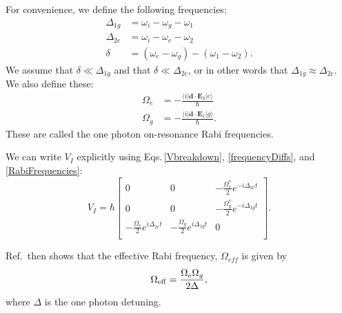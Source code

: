 For convenience, we define the following frequencies: 
\begin{align}
\label{frequencyDiffs}
\Delta_{1g}&=\omega_i-\omega_g-\omega_1\\
\Delta_{2e}&=\omega_i-\omega_e-\omega_2\\
\delta&=(\omega_e-\omega_g)-(\omega_1-\omega_2).
\end{align}
We assume that $\delta\ll\Delta_{1g}$ and that $\delta\ll\Delta_{2e}$, or in other words that $\Delta_{1g}\approx\Delta_{2e}$.
We also define these:
\begin{align}
\label{RabiFrequencies}
\Omega_e&=-\frac{\langle i | \mathbf{d}\cdot \mathbf{E}_2 | e\rangle }{\hbar}\\
\Omega_g&=-\frac{\langle i | \mathbf{d}\cdot \mathbf{E}_1 | g\rangle}{\hbar}.
\end{align}
These are called the one photon on-resonance Rabi frequencies.

We can write $V_I$ explicitly using Eqs.\,\eqref{Vbreakdown}, \eqref{frequencyDiffs}, and \eqref{RabiFrequencies}:
\begin{equation}
\label{VI_matrix_simplified}
V_I=
\hbar
\begin{bmatrix}
0 & 0 & -\frac{\Omega_e^*}{2}e^{-i\Delta_{2e}t} \\
0 & 0 & -\frac{\Omega_g^*}{2}e^{-i\Delta_{1g}t}\\
-\frac{\Omega_e}{2}e^{i\Delta_{2e}t} & -\frac{\Omega_{g}}{2}e^{i\Delta_{1g}t} & 0 \\
\end{bmatrix}.
\end{equation}

Ref.\,\cite{Young1997363} then shows that the effective Rabi frequency, $\Omega_{\mathit{eff}}$ is given by 
\begin{equation}
\Omega_{\rm eff}=\frac{\Omega_{e} \Omega_{g}}{2 \Delta},
\end{equation}
where $\Delta$ is the one photon detuning. 

